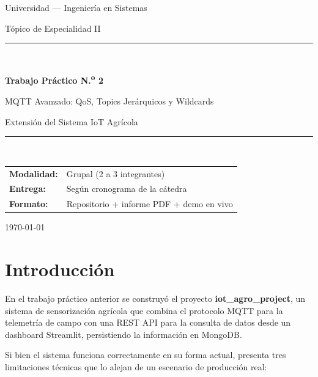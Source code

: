 \documentclass[12pt,a4paper]{article}
\begin{document}

\begin{titlepage}
  \centering
  \vspace*{1.5cm}
  {\large Universidad — Ingeniería en Sistemas\par}
  \vspace{0.3cm}
  {\large Tópico de Especialidad II\par}
  \vspace{1.5cm}
  \rule{\linewidth}{0.5pt}\\[0.4cm]
  {\LARGE\bfseries Trabajo Práctico N.\textsuperscript{o} 2\par}
  \vspace{0.4cm}
  {\Large MQTT Avanzado: QoS, Topics Jerárquicos y Wildcards\par}
  \vspace{0.4cm}
  {\large Extensión del Sistema IoT Agrícola\par}
  \rule{\linewidth}{0.5pt}\\[1.5cm]
  \begin{tabular}{ll}
    \textbf{Modalidad:}   & Grupal (2 a 3 integrantes) \\[4pt]
    \textbf{Entrega:}     & Según cronograma de la cátedra \\[4pt]
    \textbf{Formato:}     & Repositorio + informe PDF + demo en vivo \\
  \end{tabular}
  \vfill
  {\large \today\par}
\end{titlepage}

\tableofcontents
\newpage

\section{Introducción}

En el trabajo práctico anterior se construyó el proyecto \textbf{iot\_agro\_project},
un sistema de sensorización agrícola que combina el protocolo MQTT para la
telemetría de campo con una REST API para la consulta de datos desde un dashboard
Streamlit, persistiendo la información en MongoDB.

Si bien el sistema funciona correctamente en su forma actual, presenta tres
limitaciones técnicas que lo alejan de un escenario de producción real:
\end{document}
